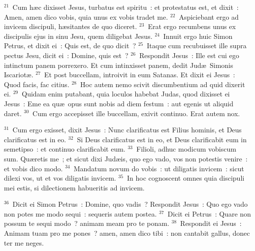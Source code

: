 ${}^{21}$~Cum h\ae c dixisset Jesus, turbatus est spiritu~: et protestatus est, et dixit~: Amen, amen dico vobis, quia unus ex vobis tradet me.
${}^{22}$~Aspiciebant ergo ad invicem discipuli, h\ae sitantes de quo diceret.
${}^{23}$~Erat ergo recumbens unus ex discipulis ejus in sinu Jesu, quem diligebat Jesus.
${}^{24}$~Innuit ergo huic Simon Petrus, et dixit ei~: Quis est, de quo dicit~?
${}^{25}$~Itaque cum recubuisset ille supra pectus Jesu, dicit ei~: Domine, quis est~?
${}^{26}$~Respondit Jesus~: Ille est cui ego intinctum panem porrexero. Et cum intinxisset panem, dedit Jud\ae\ Simonis Iscariot\ae .
${}^{27}$~Et post buccellam, introivit in eum Satanas. Et dixit ei Jesus~: Quod facis, fac citius.
${}^{28}$~Hoc autem nemo scivit discumbentium ad quid dixerit ei.
${}^{29}$~Quidam enim putabant, quia loculos habebat Judas, quod dixisset ei Jesus~: Eme ea qu\ae\ opus sunt nobis ad diem festum~: aut egenis ut aliquid daret.
${}^{30}$~Cum ergo accepisset ille buccellam, exivit continuo. Erat autem nox.


${}^{31}$~Cum ergo exisset, dixit Jesus~: Nunc clarificatus est Filius hominis, et Deus clarificatus est in eo.
${}^{32}$~Si Deus clarificatus est in eo, et Deus clarificabit eum in semetipso~: et continuo clarificabit eum.
${}^{33}$~Filioli, adhuc modicum vobiscum sum. Qu\ae retis me~; et sicut dixi Jud\ae is, quo ego vado, vos non potestis venire~: et vobis dico modo.
${}^{34}$~Mandatum novum do vobis~: ut diligatis invicem~: sicut dilexi vos, ut et vos diligatis invicem.
${}^{35}$~In hoc cognoscent omnes quia discipuli mei estis, si dilectionem habueritis ad invicem.


${}^{36}$~Dicit ei Simon Petrus~: Domine, quo vadis~? Respondit Jesus~: Quo ego vado non potes me modo sequi~: sequeris autem postea.
${}^{37}$~Dicit ei Petrus~: Quare non possum te sequi modo~? animam meam pro te ponam.
${}^{38}$~Respondit ei Jesus~: Animam tuam pro me pones~? amen, amen dico tibi~: non cantabit gallus, donec ter me neges.

